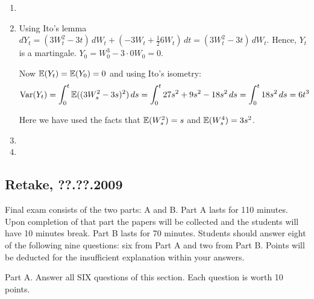 \documentclass[pdftex,12pt,a4paper]{article}
\begin{document}
\begin{enumerate}
\item 
\item Using Ito’s lemma $dY_t = (3W_t^2 - 3t) \, dW_t + (-3W_t + \frac{1}{2}6W_t) \, dt= (3W_t^2 - 3t) \, dW_t$. Hence, $Y_t$ is a martingale. $Y_0=W_0^3-3\cdot 0 W_0=0$.

Now $\mathbb{E}(Y_t)=\mathbb{E}(Y_0)=0$ and using Ito's isometry:
\[
\operatorname{Var}(Y_t)=
\int_0^t \mathbb{E}((3W_s^2-3s)^2) \, ds = \int_0^t 27s^2 +9s^2-18s^2 \, ds = \int_0^t 18s^2 \, ds = 6t^3
\]

Here we have used the facts that $\mathbb{E}(W_s^2)=s$ and $\mathbb{E}(W_s^4)=3s^2$.
\item 
\item 
\end{enumerate}

\subsection{Retake, ??.??.2009}

Final exam consists of the two parts: A and B. Part A lasts for 110 minutes.
Upon completion of that part the papers will be collected and the students will have 10 minutes break. 
Part B lasts for 70 minutes.
Students should answer eight of the following nine questions: six from Part A  and two from Part B. 
Points will be deducted for the insufficient explanation within your answers.

Part A.
Answer all SIX questions of this section. Each question is worth 10 points.
\end{document}
